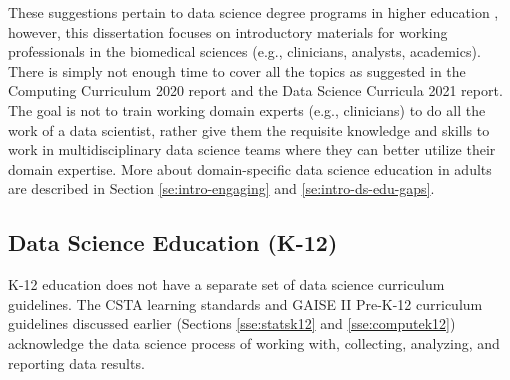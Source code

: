 \documentclass[010-intro.tex]{subfiles}
\begin{document}
    These suggestions pertain to data science degree programs in higher education
    \cite{cc2020, ccdsc2021},
    however, this dissertation focuses on introductory materials for working professionals in the biomedical sciences
    (e.g., clinicians, analysts, academics).
    There is simply not enough time to cover all the topics as suggested in the
    Computing Curriculum 2020 report and the Data Science Curricula 2021 report.
    The goal is not to train working domain experts (e.g., clinicians) to do all the work of a data scientist,
    rather give them the requisite knowledge and skills to work in multidisciplinary data science teams
    where they can better utilize their domain expertise.
    More about domain-specific data science education in adults are described in Section \ref{se:intro-engaging} and \ref{se:intro-ds-edu-gaps}.


\subsection{Data Science Education (K-12)}

    K-12 education does not have a separate set of data science curriculum guidelines.
    The CSTA learning standards and GAISE II Pre-K-12 curriculum guidelines
    discussed earlier (Sections \ref{sse:statsk12} and \ref{sse:computek12})
    acknowledge the data science process of working with, collecting, analyzing, and reporting data results.
\end{document}

